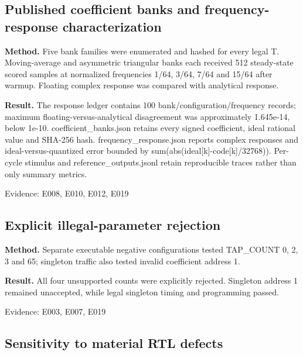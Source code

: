 \documentclass[11pt,a4paper]{article}
\begin{document}
\subsection{Published coefficient banks and frequency-response characterization}

\textbf{Method.} Five bank families were enumerated and hashed for every legal T. Moving-average and asymmetric triangular banks each received 512 steady-state scored samples at normalized frequencies 1/\allowbreak{}64,\allowbreak{} 3/\allowbreak{}64,\allowbreak{} 7/\allowbreak{}64 and 15/\allowbreak{}64 after warmup. Floating complex response was compared with analytical response.

\textbf{Result.} The response ledger contains 100 bank/\allowbreak{}configuration/\allowbreak{}frequency records; maximum floating-versus-analytical disagreement was approximately 1.645e-14,\allowbreak{} below 1e-10. coefficient\_\allowbreak{}banks.json retains every signed coefficient,\allowbreak{} ideal rational value and SHA-256 hash. frequency\_\allowbreak{}response.json reports complex responses and ideal-versus-quantized error bounded by sum(\allowbreak{}abs(\allowbreak{}ideal[\allowbreak{}k]\allowbreak{}-code[\allowbreak{}k]\allowbreak{}/\allowbreak{}32768)\allowbreak{})\allowbreak{}. Per-cycle stimulus and reference\_\allowbreak{}outputs.jsonl retain reproducible traces rather than only summary metrics.

{\small Evidence: E008,\allowbreak{} E010,\allowbreak{} E012,\allowbreak{} E019}

\subsection{Explicit illegal-parameter rejection}

\textbf{Method.} Separate executable negative configurations tested TAP\_\allowbreak{}COUNT 0,\allowbreak{} 2,\allowbreak{} 3 and 65; singleton traffic also tested invalid coefficient address 1.

\textbf{Result.} All four unsupported counts were explicitly rejected. Singleton address 1 remained unaccepted,\allowbreak{} while legal singleton timing and programming passed.

{\small Evidence: E003,\allowbreak{} E007,\allowbreak{} E019}

\subsection{Sensitivity to material RTL defects}
\end{document}
